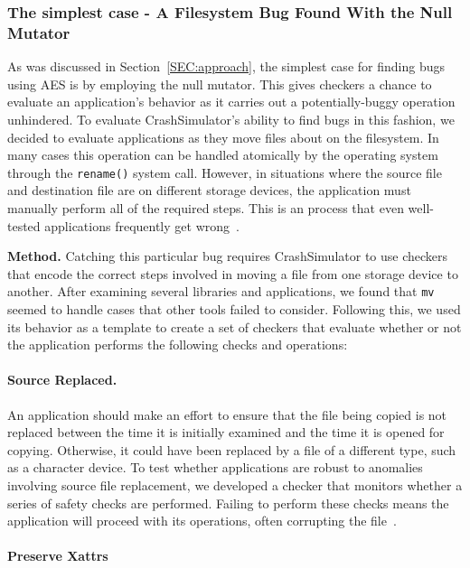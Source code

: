 \subsubsection{The simplest case - A Filesystem Bug Found With the Null Mutator}

As was discussed in Section~\ref{SEC:approach},
the simplest case for finding bugs
using AES is by employing the null mutator.
This gives checkers
a chance to evaluate an application's behavior
as it carries out a potentially-buggy operation unhindered.
To evaluate CrashSimulator's ability to find bugs
in this fashion, we decided to evaluate applications
as they move files about on the filesystem.
In many cases this operation can be handled
atomically by the operating system
through the {\tt rename()} system call.
However,
in situations where the source file and destination file
are on different storage devices,
the application must
manually perform all of the required steps.
This is an process
that even well-tested applications
frequently get wrong~\cite{PHPRenameBug,PythonShutilBug,NodejsCopyBug}.

{\bf Method.}  Catching this particular bug requires CrashSimulator to use
checkers that encode the correct steps involved in moving a file from one
storage device to another.
After examining several libraries and applications,
we found that
{\tt mv} seemed to handle cases that other tools failed to consider.
Following this, we
used its behavior as a template to create a set of checkers
that evaluate whether or not
the application performs the following
checks and operations:

\paragraph{Source Replaced.}

An application should make an effort
to ensure that the file being copied
is not replaced between the time it is initially examined
and the time it is opened for copying.
Otherwise,
it could have been replaced by a file of a different type,
such as a character device.
To test whether applications are robust
to anomalies involving source file replacement,
we developed a checker that monitors whether a series of safety checks
are performed.
Failing to perform these checks
means the application will proceed with its operations,
often corrupting the file~\cite{PythonShutilBug}.

\paragraph{Preserve Xattrs}

